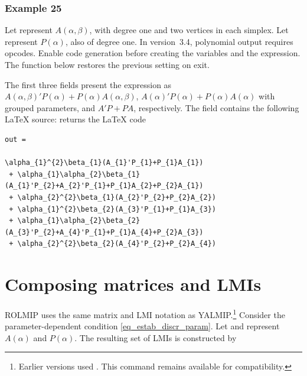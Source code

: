 \documentclass[english,11pt]{article}
\theoremstyle{break} \theorembodyfont{\small\rm}
\begin{document}
\subsubsection*{Example 25}

Let  represent $A(\alpha,\beta)$, with degree one and two vertices
in each simplex. Let  represent $P(\alpha)$, also of degree one.
In version~3.4, polynomial output requires opcodes. Enable code generation
before creating the variables and the expression. The function below
restores the previous setting on exit.


The first three fields present the expression as
$A(\alpha,\beta)'P(\alpha)+P(\alpha)A(\alpha,\beta)$,
$A(\alpha)'P(\alpha)+P(\alpha)A(\alpha)$ with grouped parameters, and
$A'P+PA$, respectively. The field  contains
the following \LaTeX{} source:
\noindent returns the {\LaTeX} code


\noindent\begin{minipage}{\linewidth}
{\small
\begin{lstlisting}[rulecolor=\color{red}]
out =

\alpha_{1}^{2}\beta_{1}(A_{1}'P_{1}+P_{1}A_{1})
 + \alpha_{1}\alpha_{2}\beta_{1}(A_{1}'P_{2}+A_{2}'P_{1}+P_{1}A_{2}+P_{2}A_{1})
 + \alpha_{2}^{2}\beta_{1}(A_{2}'P_{2}+P_{2}A_{2})
 + \alpha_{1}^{2}\beta_{2}(A_{3}'P_{1}+P_{1}A_{3})
 + \alpha_{1}\alpha_{2}\beta_{2}(A_{3}'P_{2}+A_{4}'P_{1}+P_{1}A_{4}+P_{2}A_{3})
 + \alpha_{2}^{2}\beta_{2}(A_{4}'P_{2}+P_{2}A_{4})
\end{lstlisting}
}
\end{minipage}


\section{Composing matrices and LMIs}\label{construct_lmi}
ROLMIP uses the same matrix and LMI notation as YALMIP.\footnote{Earlier
versions used . This command remains available for
compatibility.} Consider the parameter-dependent condition
\eqref{eq_estab_discr_param}.
Let  and  represent $A(\alpha)$ and $P(\alpha)$.
The resulting set of LMIs is constructed by

\vspace{0.5cm}%
\noindent\begin{minipage}{\linewidth}
\end{minipage}
\vspace{0.2cm}
\end{document}
